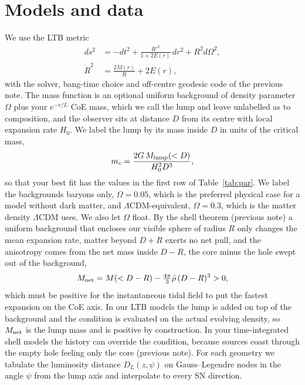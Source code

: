 \documentclass[10pt,twocolumn,letterpaper]{article}
\begin{document}
\section{Models and data}
We use the LTB metric \cite{Bondi1947,Bolejko2011}
\begin{equation}\label{eq:ltb}
\begin{split}ds^2&=-dt^2+\frac{R'^2}{1+2E(r)}\,dr^2+R^2d\Omega^2,\\ \dot R^2&=\frac{2M(r)}{R}+2E(r),\end{split}
\end{equation}
with the solver, bang-time choice and off-centre geodesic code of the previous note. The mass function is an optional uniform background of density parameter $\Omega$ plus your $e^{-r/L}$ CoE mass, which we call the lump and leave unlabelled as to composition, and the observer sits at distance $D$ from its centre with local expansion rate $H_0$. We label the lump by its mass inside $D$ in units of the critical mass,
\begin{equation}\label{eq:mc}
m_c=\frac{2G\,M_{\rm lump}(<D)}{H_0^2D^3},
\end{equation}
so that your best fit has the values in the first row of Table~\ref{tab:par}. We label the backgrounds baryons only, $\Omega=0.05$, which is the preferred physical case for a model without dark matter, and $\Lambda$CDM-equivalent, $\Omega=0.3$, which is the matter density $\Lambda$CDM uses. We also let $\Omega$ float. By the shell theorem (previous note) a uniform background that encloses our visible sphere of radius $R$ only changes the mean expansion rate, matter beyond $D+R$ exerts no net pull, and the anisotropy comes from the net mass inside $D-R$, the core minus the hole swept out of the background,
\begin{equation}\label{eq:mnet}
M_{\rm net}=M(<D-R)-\tfrac{4\pi}{3}\bar\rho\,(D-R)^3>0 ,
\end{equation}
which must be positive for the instantaneous tidal field to put the fastest expansion on the CoE axis. In our LTB models the lump is added on top of the background and the condition is evaluated on the actual evolving density, so $M_{\rm net}$ is the lump mass and is positive by construction. In your time-integrated shell models the history can override the condition, because sources coast through the empty hole feeling only the core (previous note). For each geometry we tabulate the luminosity distance $D_L(z,\psi)$ on Gauss--Legendre nodes in the angle $\psi$ from the lump axis and interpolate to every SN direction.
\end{document}

